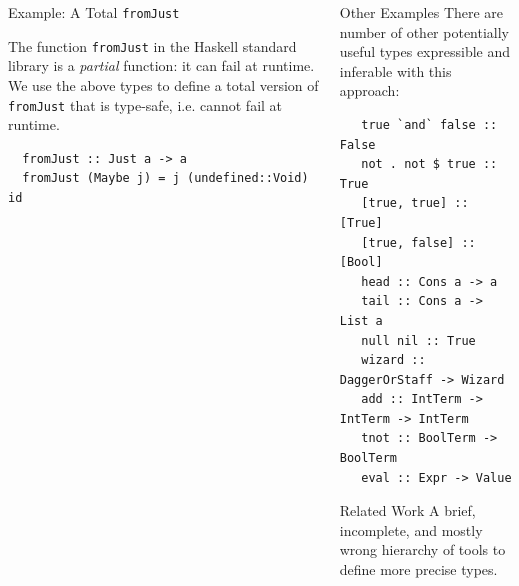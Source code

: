\documentclass[final]{beamer}
\begin{document}
\begin{frame}[fragile]
\begin{columns}[t]
\begin{column}{.33\textwidth}
\begin{block}{Example: A Total \texttt{fromJust}}
\begin{figure}[!h]
\end{figure}

The function \texttt{fromJust} in the Haskell standard library is a
\emph{partial} function: it can fail at runtime. We use the above types to
define a total version of \texttt{fromJust} that is type-safe, i.e. cannot
fail at runtime.

\begin{verbatim}
  fromJust :: Just a -> a
  fromJust (Maybe j) = j (undefined::Void) id 
\end{verbatim}

\end{block}

\end{column}

\begin{column}{.285\textwidth}
\begin{block}{Other Examples}
\vspace{0.5cm}
There are number of other potentially useful types expressible and
inferable with this approach:

\begin{verbatim}
   true `and` false :: False
   not . not $ true :: True
   [true, true] :: [True]
   [true, false] :: [Bool]
   head :: Cons a -> a
   tail :: Cons a -> List a
   null nil :: True
   wizard :: DaggerOrStaff -> Wizard
   add :: IntTerm -> IntTerm -> IntTerm
   tnot :: BoolTerm -> BoolTerm 
   eval :: Expr -> Value
\end{verbatim}

\end{block}
\vspace{1cm}
\begin{block}{Related Work}
\vspace{0.5cm}
A brief, incomplete, and mostly wrong hierarchy of tools to define more precise
types. 

\vspace{0.5cm}
\centering
{}


\end{block}
\end{column}
\end{columns}
\end{frame}
\end{document}
